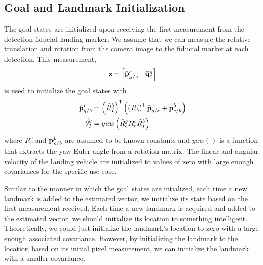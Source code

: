 
\subsection{Goal and Landmark Initialization}
The goal states are initialized upon receiving the first measurement from
the detection fiducial landing marker. We assume that we can measure the
relative translation and rotation from the camera image to the fiducial marker
at each detection. This measurement,
\begin{equation}
  \bar{\boldsymbol{\mathrm{z}}} =
  \begin{bmatrix}
    \bar{\boldsymbol{\mathrm{p}}}_{g/c}^c & \bar{\boldsymbol{\mathrm{q}}}_c^g
  \end{bmatrix}
\end{equation}
is used to initialize the goal states with
\begin{align}
  \hat{\boldsymbol{\mathrm{p}}}_{g/b}^v &= \left( \hat{R}_I^b \right)^{\mathsf{T}} \left( \left ( R_b^c
  \right)^{\mathsf{T}} \bar{\boldsymbol{\mathrm{p}}}_{g/c}^c + \boldsymbol{\mathrm{p}}_{c/b}^b
\right)   \\
      \hat{\theta_I^g} &= yaw \left( \bar{R}_c^g R_b^c \hat{R}_I^b \right)
\end{align}
where $R_b^c$ and $\boldsymbol{\mathrm{p}}_{c/b}^b$ are assumed to be known constants and
$yaw()$ is a function that extracts the yaw Euler angle from a rotation matrix.
The linear and angular velocity of the landing vehicle are initialized to values
of zero with large enough covariances for the specific use case.

Similar to the manner in which the goal states are intialized, each time a new
landmark is added to the estimated vector, we initialize its state based on the
first measurement received. 
Each time a new landmark is acquired and added to the estimated vector, we
should initialize its location to something intelligent. Theoretically, we could
just initialize the landmark's location to zero with a large enough associated
covariance. However, by initializing the landmark to the location based on its
initial pixel measurement, we can initialize the landmark with a smaller
covariance.

